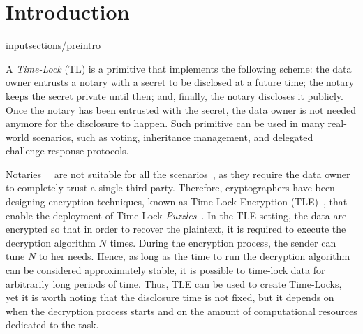 \section{Introduction}\label{sect:introduction}
input{sections/preintro}



A \textit{Time-Lock} (TL) is a primitive that implements the following scheme:
the data owner entrusts a notary with a secret to be disclosed at a
future time; the notary keeps the secret private until then; and,
finally, the notary discloses it publicly. Once the notary has been entrusted with the secret, the data owner is not needed anymore for the disclosure to happen.
Such primitive can be used in many real-world scenarios, such as voting, inheritance management, and delegated challenge-response protocols.

Notaries~\cite{10.1007/BFb0032349}~\cite{rabin2006time} are not
suitable for all the scenarios~\cite{Abelson:1997:RKR:275079.275104},
as they require the data owner to completely trust a single third party.
Therefore, cryptographers have been designing encryption techniques, known as Time-Lock Encryption (TLE)~\cite{may1993timed}, that enable the deployment of Time-Lock {\em Puzzles}~\cite{mahmoody-tl,Bitansky:2016:TPR:2840728.2840745}.
In the TLE setting, the data are encrypted so that in order to recover the plaintext, it is required to execute the decryption algorithm $N$ times.
During the encryption process, the sender can tune $N$ to her needs.
Hence, as long as the time to run the decryption algorithm can be considered approximately stable, it is possible to time-lock data for arbitrarily long periods of time.
Thus, TLE can be used to create Time-Locks, yet it is worth noting
that the disclosure time is not fixed, but it depends on when
the decryption process starts and on the amount of computational resources
dedicated to the task.

